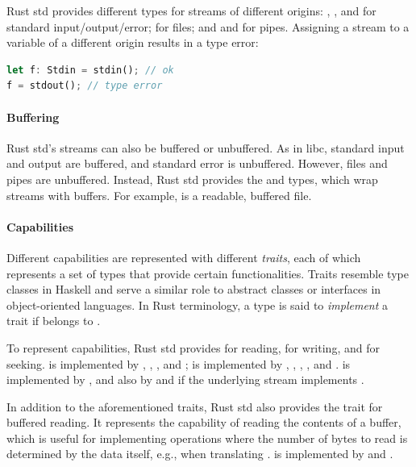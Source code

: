 Rust std provides different types for streams of different origins:
%
, , and  for standard input/output/error;
%
 for files;
%
and  and  for pipes.
%
Assigning a stream to a variable of a different origin results in a type error:

\begin{lstlisting}[language=Rust]
let f: Stdin = stdin(); // ok
f = stdout(); // type error
\end{lstlisting}

\paragraph{Buffering}

Rust std's streams can also be buffered or unbuffered.
%
As in libc, standard input and output are buffered, and standard error is
unbuffered.
%
However, files and pipes are unbuffered.
%
Instead, Rust std provides the  and  types, which wrap
streams with buffers.
%
For example, \CT{<}\CT{>} is a readable, buffered file.

\paragraph{Capabilities}

Different capabilities are represented with different \emph{traits}, each of
which represents a set of types that provide certain functionalities.
%
Traits resemble type classes in Haskell and serve a similar role to abstract
classes or interfaces in object-oriented languages.
%
In Rust terminology, a type  is said to \emph{implement} a trait  if
 belongs to .

To represent capabilities, Rust std provides  for reading,  for
writing, and  for seeking.
%
 is implemented by , , , and
;
%
 is implemented by , , , ,
and .
%
 is implemented by , and also by  and 
if the underlying stream implements .

In addition to the aforementioned traits, Rust std also provides the 
trait for buffered reading.
%
It represents the capability of reading the contents of a buffer, which is
useful for implementing operations where the number of bytes to read is
determined by the data itself, e.g., when translating .
%
 is implemented by  and .
%

